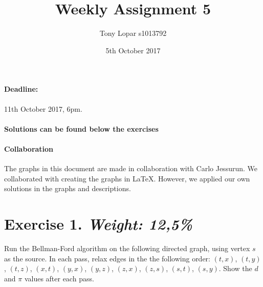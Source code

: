 \documentclass{article}
\begin{document}
\title{Weekly Assignment 5}
\date{5th October 2017}
\author{Tony Lopar s1013792}
\maketitle

\paragraph{Deadline:} 11th October 2017, 6pm.
\paragraph{Solutions can be found below the exercises}
\paragraph{Collaboration} The graphs in this document are made in collaboration with Carlo Jessurun. We collaborated with creating the graphs in LaTeX. However, we applied our own solutions in the graphs and descriptions.

\section*{Exercise 1. \textit{Weight: 12,5\%}}

Run the Bellman-Ford algorithm on the following directed graph, using vertex $s$ as the source. In each pass, relax edges in the the following order: $(t,x)$, $(t,y)$, $(t,z)$, $(x,t)$, $(y,x)$, $(y,z)$, $(z,x)$, $(z,s)$, $(s,t)$, $(s,y)$. Show the $d$ and $\pi$ values after each pass.


\end{document}
